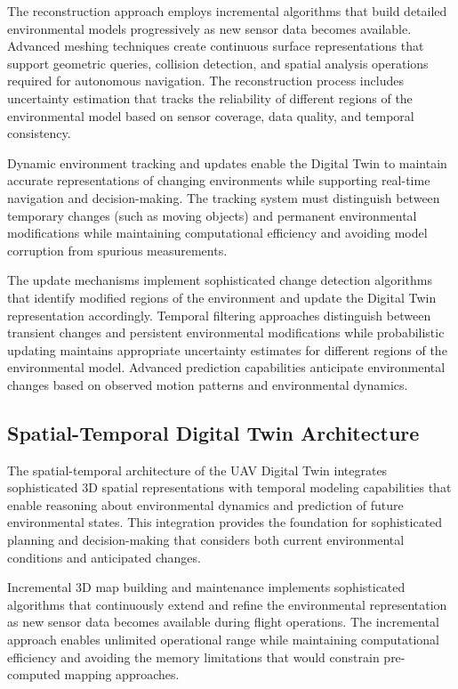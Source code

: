 The reconstruction approach employs incremental algorithms that build detailed environmental models progressively as new sensor data becomes available. Advanced meshing techniques create continuous surface representations that support geometric queries, collision detection, and spatial analysis operations required for autonomous navigation. The reconstruction process includes uncertainty estimation that tracks the reliability of different regions of the environmental model based on sensor coverage, data quality, and temporal consistency.

Dynamic environment tracking and updates enable the Digital Twin to maintain accurate representations of changing environments while supporting real-time navigation and decision-making. The tracking system must distinguish between temporary changes (such as moving objects) and permanent environmental modifications while maintaining computational efficiency and avoiding model corruption from spurious measurements.

The update mechanisms implement sophisticated change detection algorithms that identify modified regions of the environment and update the Digital Twin representation accordingly. Temporal filtering approaches distinguish between transient changes and persistent environmental modifications while probabilistic updating maintains appropriate uncertainty estimates for different regions of the environmental model. Advanced prediction capabilities anticipate environmental changes based on observed motion patterns and environmental dynamics.

\subsection{Spatial-Temporal Digital Twin Architecture}

The spatial-temporal architecture of the UAV Digital Twin integrates sophisticated 3D spatial representations with temporal modeling capabilities that enable reasoning about environmental dynamics and prediction of future environmental states. This integration provides the foundation for sophisticated planning and decision-making that considers both current environmental conditions and anticipated changes.

Incremental 3D map building and maintenance implements sophisticated algorithms that continuously extend and refine the environmental representation as new sensor data becomes available during flight operations. The incremental approach enables unlimited operational range while maintaining computational efficiency and avoiding the memory limitations that would constrain pre-computed mapping approaches.

